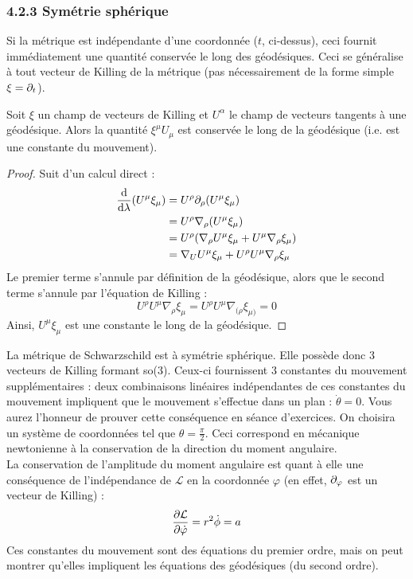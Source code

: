 \subsubsection{4.2.3 Symétrie sphérique}
Si la métrique est indépendante d'une coordonnée ($t$, ci-dessus), ceci fournit immédiatement une quantité conservée le long des géodésiques. Ceci se généralise à tout vecteur de Killing de la métrique (pas nécessairement de la forme simple $\xi = \partial_t$).
\begin{theoremframe}
    \begin{propri}
        Soit $\xi$ un champ de vecteurs de Killing et $U^\alpha$ le champ de vecteurs tangents à une géodésique. Alors la quantité $\xi^\mu U_\mu$ est conservée le long de la géodésique (i.e. est une constante du mouvement).
    \end{propri}
\end{theoremframe}
\begin{proof}
    Suit d'un calcul direct :
    \begin{align}
        \frac{\mathrm{d}}{ \mathrm{d} \lambda} (U^\mu \xi_\mu) &= U^\rho \partial_\rho (U^\mu \xi_\mu)\\
        &= U^\rho \nabla_\rho (U^\mu \xi_\mu)\\
        &= U^\rho (\nabla_\rho U^\mu \xi_\mu + U^\mu \nabla_\rho \xi_\mu) \\
        &=  \nabla_U U^\mu \xi_\mu + U^\rho U^\mu \nabla_\rho \xi_\mu
    \end{align}
    Le premier terme s'annule par définition de la géodésique, alors que le second terme s'annule par l'équation de Killing :
    \begin{equation}
        U^\rho U^\mu \nabla_\rho \xi_\mu = U^\rho U^\mu \nabla_{(\rho} \xi_{\mu)} = 0
    \end{equation}
    Ainsi, $U^\mu \xi_\mu$ est une constante le long de la géodésique.
\end{proof}
La métrique de Schwarzschild est à symétrie sphérique. Elle possède donc 3 vecteurs de Killing formant so(3). Ceux-ci fournissent 3 constantes du mouvement supplémentaires : deux combinaisons linéaires indépendantes de ces constantes du mouvement impliquent que le mouvement s'effectue dans un plan : $\dot{\theta} = 0$. Vous aurez l'honneur de prouver cette conséquence en séance d'exercices. On choisira un système de coordonnées tel que $\theta  = \frac{\pi}{2}$. Ceci correspond en mécanique newtonienne à la conservation de la direction du moment angulaire.\\
La conservation de l'amplitude du moment angulaire est quant à elle une conséquence de l'indépendance de $\mathcal{L}$ en la coordonnée $\varphi$ (en effet, $\partial_\varphi$ est un vecteur de Killing) :
\begin{equation}
    \frac{\partial \mathcal{L}}{\partial \dot{\varphi}} = r^2 \dot{\phi} = a
\end{equation}
Ces constantes du mouvement sont des équations du premier ordre, mais on peut montrer qu'elles impliquent les équations des géodésiques (du second ordre).
